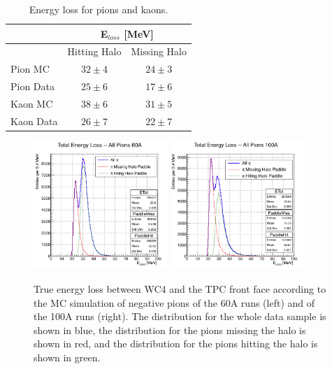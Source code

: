 \begin{table}[b]
\centering
\begin{tabular}{|l|c|c|}  
\hline
                          &  \multicolumn{2}{c|}{E$_{loss}$ [MeV]}    \\ \hline
                          & Hitting Halo          & Missing Halo     \\ \hline
Pion  MC           &  $32 \pm 4 $         &    $24 \pm 3$     \\ \hline
Pion Data          &  $25 \pm 6$          &    $17 \pm 6 $    \\ \hline
Kaon  MC          &  $38 \pm 6 $        &     $31 \pm 5 $    \\ \hline
Kaon Data         &  $26 \pm 7 $        &     $22 \pm 7 $    \\ \hline
\end{tabular}
\caption{Energy loss for pions and kaons.}
\label{tab:Eloss}
\end{table}





\begin{figure}[hbpt]
\centering
\includegraphics[width=0.45\textwidth]{Chapter-5/Images/E_loss60A.png}
\includegraphics[width=0.45\textwidth]{Chapter-5/Images/E_loss100A.png}
\caption{True energy loss between WC4 and the TPC front face according to the MC simulation of negative pions of the 60A runs (left) and of the 100A runs (right). The distribution for the whole data sample is shown in blue, the distribution for the pions missing the halo is shown in red, and the distribution for the pions hitting the halo is shown in green.  }
\label{fig:ELoss60A}
\end{figure}

